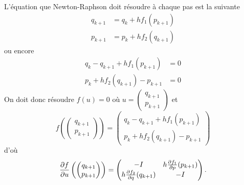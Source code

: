 L'équation que Newton-Raphson doit résoudre à chaque pas est la suivante
\begin{align*}
  q_{k+1} & = q_k + hf_1(p_{k+1})\\
  p_{k+1} & = p_k + hf_2(q_{k+1})
\end{align*}
ou encore
\begin{align*}
  q_k - q_{k+1} + hf_1(p_{k+1}) & = 0\\
  p_k + hf_2(q_{k+1}) - p_{k+1} & = 0
\end{align*}
On doit donc résoudre $f(u) = 0$ où
$u =
\begin{pmatrix}
  q_{k+1}\\
  p_{k+1}
\end{pmatrix}$
et
\[
  f
  \left(
    \begin{pmatrix}
      q_{k+1}\\
      p_{k+1}
    \end{pmatrix}
  \right) =
  \begin{pmatrix}
    q_k - q_{k+1} + hf_1(p_{k+1})\\
    p_k + hf_2(q_{k+1}) - p_{k+1}
  \end{pmatrix}
\]
d'où
\[
  \frac{\partial f}{\partial u}
  \left(
    \begin{pmatrix}
      q_{k+1}\\
      p_{k+1}
    \end{pmatrix}
  \right) =
  \begin{pmatrix}
    -I & h\frac{\partial f_1}{\partial p}(p_{k+1})\\
    h\frac{\partial f_2}{\partial q}(q_{k+1}) & -I
  \end{pmatrix}.
\]

